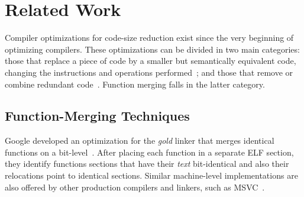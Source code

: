 
\section{Related Work}

Compiler optimizations for code-size reduction exist since the very beginning
of optimizing compilers.
These optimizations can be divided in two main categories:
those that replace a piece of code by a smaller but semantically equivalent code,
changing the instructions and operations performed~\cite{massalin87,tanenbaum82};
and those that remove or combine redundant code~\cite{cocke70,knoop94,ernst97,
                                              cooper99,debray00,chen03,loki04}.
Function merging falls in the latter category.

\subsection{Function-Merging Techniques}

Google developed an optimization for the \textit{gold} linker that merges
identical functions on a bit-level~\cite{tallam10,kwan12}.
After placing each function in a separate ELF section, they identify functions
sections that have their \textit{text} bit-identical and also their
relocations point to identical sections.
Similar machine-level implementations are also offered by other production compilers
and linkers, such as MSVC~\cite{msvc-icf}.

